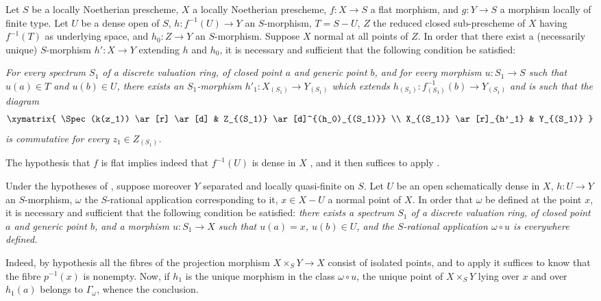 \begin{corollary}[20.4.9]
\label{IV.20.4.9}
Let $S$ be a locally Noetherian prescheme, $X$ a locally Noetherian prescheme, $f:X\to S$ a flat morphism, and $g:Y\to S$ a morphism locally of finite type.
Let $U$ be a dense open of $S$, $h:f^{-1}(U)\to Y$ an $S$-morphism, $T=S-U$, $Z$ the reduced closed sub-prescheme of $X$ having $f^{-1}(T)$ as underlying space, and $h_0:Z\to Y$ an $S$-morphism.
Suppose $X$ normal at all points of $Z$.
In order that there exist a (necessarily unique) $S$-morphism $h':X\to Y$ extending $h$ and $h_0$, it is necessary and sufficient that the following condition be satisfied:

\emph{For every spectrum $S_1$ of a discrete valuation ring, of closed point $a$ and generic point $b$, and for every morphism $u:S_1\to S$ such that $u(a)\in T$ and $u(b)\in U$, there exists an $S_1$-morphism $h'_1:X_{(S_1)}\to Y_{(S_1)}$ which extends $h_{(S_1)}:f_{(S_1)}^{-1}(b)\to Y_{(S_1)}$ and is such that the diagram}
\[
  \xymatrix{
  \Spec(k(z_1)) \ar[r] \ar[d] & Z_{(S_1)} \ar[d]^{(h_0)_{(S_1)}} \\
  X_{(S_1)} \ar[r]_{h'_1} & Y_{(S_1)}
  }
\]
\emph{is commutative for every $z_1\in Z_{(S_1)}$.}

The hypothesis that $f$ is flat implies indeed that $f^{-1}(U)$ is dense in $X$ , and it then suffices to apply .
\end{corollary}

\begin{corollary}[20.4.10]
\label{IV.20.4.10}
Under the hypotheses of , suppose moreover $Y$ separated and locally quasi-finite on $S$.
Let $U$ be an open schematically dense in $X$, $h:U\to Y$ an $S$-morphism, $\omega$ the $S$-rational application corresponding to it, $x\in X-U$ a normal point of $X$.
In order that $\omega$ be defined at the point $x$, it is necessary and sufficient that the following condition be satisfied:
\emph{there exists a spectrum $S_1$ of a discrete valuation ring, of closed point $a$ and generic point $b$, and a morphism $u:S_1\to X$ such that $u(a)=x$, $u(b)\in U$, and the $S$-rational application $\omega\circ u$ is everywhere defined.}

Indeed, by hypothesis all the fibres of the projection morphism $X\times_S Y\to X$ consist of isolated points, and to apply  it suffices to know that the fibre $p^{-1}(x)$ is nonempty.
Now, if $h_1$ is the unique morphism in the class $\omega\circ u$, the unique point of $X\times_S Y$ lying over $x$ and over $h_1(a)$ belongs to $\Gamma_\omega$, whence the conclusion.
\end{corollary}


